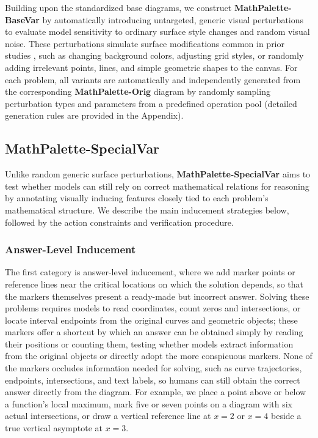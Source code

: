\documentclass{article}
\theoremstyle{plain}
\theoremstyle{definition}
\theoremstyle{remark}
\begin{document}
Building upon the standardized base diagrams, we construct \textbf{MathPalette-BaseVar} by automatically introducing untargeted, generic visual perturbations to evaluate model sensitivity to ordinary surface style changes and random visual noise. These perturbations simulate surface modifications common in prior studies \cite{zou2025dynamath, zhao2025rommath, bae2026idis}, such as changing background colors, adjusting grid styles, or randomly adding irrelevant points, lines, and simple geometric shapes to the canvas. For each problem, all variants are automatically and independently generated from the corresponding \textbf{MathPalette-Orig} diagram by randomly sampling perturbation types and parameters from a predefined operation pool (detailed generation rules are provided in the Appendix).

\subsection{MathPalette-SpecialVar}

Unlike random generic surface perturbations, \textbf{MathPalette-SpecialVar} aims to test whether models can still rely on correct mathematical relations for reasoning by annotating visually inducing features closely tied to each problem's mathematical structure. We describe the main inducement strategies below, followed by the action constraints and verification procedure.

\subsubsection{Answer-Level Inducement}

The first category is answer-level inducement, where we add marker points or reference lines near the critical locations on which the solution depends, so that the markers themselves present a ready-made but incorrect answer. Solving these problems requires models to read coordinates, count zeros and intersections, or locate interval endpoints from the original curves and geometric objects; these markers offer a shortcut by which an answer can be obtained simply by reading their positions or counting them, testing whether models extract information from the original objects or directly adopt the more conspicuous markers. None of the markers occludes information needed for solving, such as curve trajectories, endpoints, intersections, and text labels, so humans can still obtain the correct answer directly from the diagram. For example, we place a point above or below a function's local maximum, mark five or seven points on a diagram with six actual intersections, or draw a vertical reference line at $x=2$ or $x=4$ beside a true vertical asymptote at $x=3$.
\end{document}
